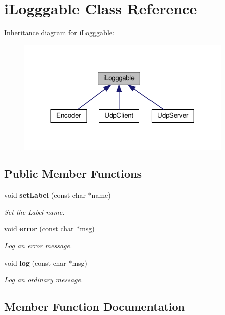 \section{i\+Logggable Class Reference}
\label{classi_logggable}


Inheritance diagram for i\+Logggable\+:
\nopagebreak
\begin{figure}[H]
\begin{center}
\leavevmode
\includegraphics[width=293pt]{classi_logggable__inherit__graph}
\end{center}
\end{figure}
\subsection*{Public Member Functions}
\begin{DoxyCompactItemize}
\item 
void \textbf{ set\+Label} (const char $\ast$name)
\begin{DoxyCompactList}\small\item\em Set the Label name. \end{DoxyCompactList}\item 
void \textbf{ error} (const char $\ast$msg)
\begin{DoxyCompactList}\small\item\em Log an error message. \end{DoxyCompactList}\item 
void \textbf{ log} (const char $\ast$msg)
\begin{DoxyCompactList}\small\item\em Log an ordinary message. \end{DoxyCompactList}\end{DoxyCompactItemize}


\subsection{Member Function Documentation}
\mbox{\label{classi_logggable_ae7bda22bccfb292f6d9be01d3b5aaeaf}} 
